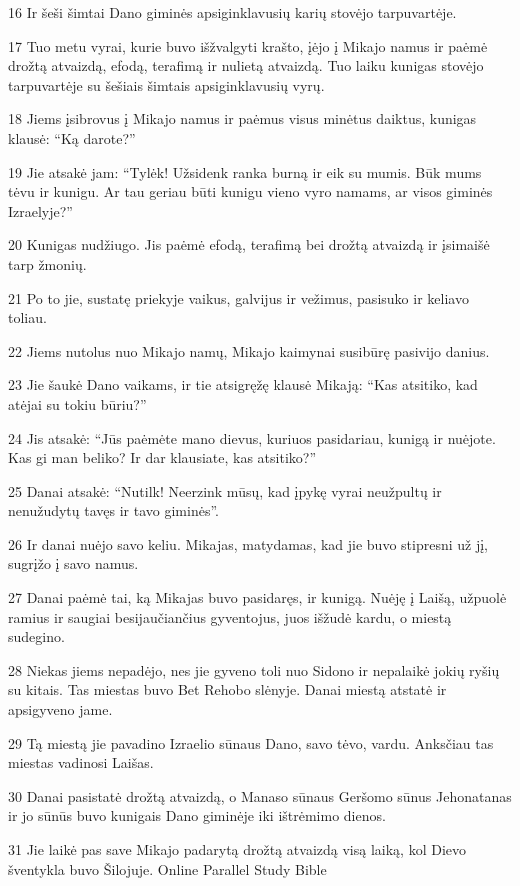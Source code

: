 \par 16 Ir šeši šimtai Dano giminės apsiginklavusių karių stovėjo tarpuvartėje. 
\par 17 Tuo metu vyrai, kurie buvo išžvalgyti krašto, įėjo į Mikajo namus ir paėmė drožtą atvaizdą, efodą, terafimą ir nulietą atvaizdą. Tuo laiku kunigas stovėjo tarpuvartėje su šešiais šimtais apsiginklavusių vyrų. 
\par 18 Jiems įsibrovus į Mikajo namus ir paėmus visus minėtus daiktus, kunigas klausė: “Ką darote?” 
\par 19 Jie atsakė jam: “Tylėk! Užsidenk ranka burną ir eik su mumis. Būk mums tėvu ir kunigu. Ar tau geriau būti kunigu vieno vyro namams, ar visos giminės Izraelyje?” 
\par 20 Kunigas nudžiugo. Jis paėmė efodą, terafimą bei drožtą atvaizdą ir įsimaišė tarp žmonių. 
\par 21 Po to jie, sustatę priekyje vaikus, galvijus ir vežimus, pasisuko ir keliavo toliau. 
\par 22 Jiems nutolus nuo Mikajo namų, Mikajo kaimynai susibūrę pasivijo danius. 
\par 23 Jie šaukė Dano vaikams, ir tie atsigręžę klausė Mikają: “Kas atsitiko, kad atėjai su tokiu būriu?” 
\par 24 Jis atsakė: “Jūs paėmėte mano dievus, kuriuos pasidariau, kunigą ir nuėjote. Kas gi man beliko? Ir dar klausiate, kas atsitiko?” 
\par 25 Danai atsakė: “Nutilk! Neerzink mūsų, kad įpykę vyrai neužpultų ir nenužudytų tavęs ir tavo giminės”. 
\par 26 Ir danai nuėjo savo keliu. Mikajas, matydamas, kad jie buvo stipresni už jį, sugrįžo į savo namus. 
\par 27 Danai paėmė tai, ką Mikajas buvo pasidaręs, ir kunigą. Nuėję į Laišą, užpuolė ramius ir saugiai besijaučiančius gyventojus, juos išžudė kardu, o miestą sudegino. 
\par 28 Niekas jiems nepadėjo, nes jie gyveno toli nuo Sidono ir nepalaikė jokių ryšių su kitais. Tas miestas buvo Bet Rehobo slėnyje. Danai miestą atstatė ir apsigyveno jame. 
\par 29 Tą miestą jie pavadino Izraelio sūnaus Dano, savo tėvo, vardu. Anksčiau tas miestas vadinosi Laišas. 
\par 30 Danai pasistatė drožtą atvaizdą, o Manaso sūnaus Geršomo sūnus Jehonatanas ir jo sūnūs buvo kunigais Dano giminėje iki ištrėmimo dienos. 
\par 31 Jie laikė pas save Mikajo padarytą drožtą atvaizdą visą laiką, kol Dievo šventykla buvo Šilojuje.
Online Parallel Study Bible




